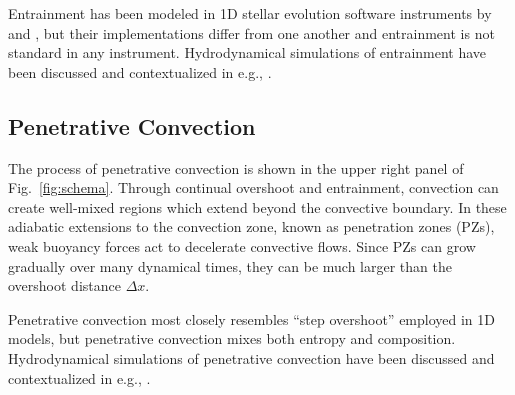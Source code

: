 Entrainment has been modeled in 1D stellar evolution software instruments by \citet{staritsin_2013} and \citet{scott_etal_2021}, but their implementations differ from one another and entrainment is not standard in any instrument.
Hydrodynamical simulations of entrainment have been discussed and contextualized in e.g., \citet{fuentes_cumming_2020}.


\subsection{Penetrative Convection}
The process of penetrative convection is shown in the upper right panel of Fig.~\ref{fig:schema}.
Through continual overshoot and entrainment, convection can create well-mixed regions which extend beyond the convective boundary.
In these adiabatic extensions to the convection zone, known as penetration zones (PZs), weak buoyancy forces act to decelerate convective flows.
Since PZs can grow gradually over many dynamical times, they can be much larger than the overshoot distance $\Delta x$.

Penetrative convection most closely resembles ``step overshoot'' employed in 1D models, but penetrative convection mixes both entropy and composition.
Hydrodynamical simulations of penetrative convection have been discussed and contextualized in e.g., \citet{anders_etal_2021}.
